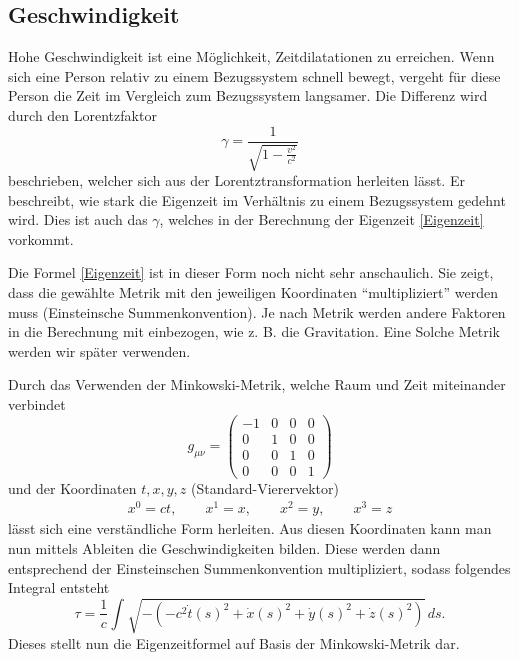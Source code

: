 \begin{refsection}
\subsection{Geschwindigkeit}
Hohe Geschwindigkeit ist eine Möglichkeit, Zeitdilatationen zu erreichen. Wenn sich eine Person relativ zu einem Bezugssystem schnell bewegt, vergeht für diese Person die Zeit im Vergleich zum Bezugssystem langsamer. Die Differenz wird durch den Lorentzfaktor 
\begin{equation} \label{lorentzfaktor}
\gamma=\frac{1}{\sqrt{1-\displaystyle\frac{v^2}{c^2}}} 
\end{equation}
beschrieben, welcher sich aus der Lorentztransformation herleiten lässt.
Er beschreibt, wie stark die Eigenzeit im Verhältnis zu einem Bezugssystem gedehnt wird. 
Dies ist auch das $\gamma$, welches in der Berechnung der Eigenzeit \eqref{Eigenzeit} vorkommt. 

Die Formel \eqref{Eigenzeit} ist in dieser Form noch nicht sehr anschaulich. Sie zeigt, dass die gewählte Metrik mit den jeweiligen Koordinaten ``multipliziert'' werden muss (Einsteinsche Summenkonvention). Je nach Metrik werden andere Faktoren in die Berechnung mit einbezogen, wie z. B. die Gravitation. Eine Solche Metrik werden wir später verwenden.

Durch das Verwenden der Minkowski-Metrik, welche Raum und Zeit miteinander verbindet 
\begin{equation}
    g_{\mu\nu}=
    \begin{pmatrix}
        -1 & 0 & 0 & 0 \\
        0 & 1 & 0 & 0 \\
        0 & 0 & 1 & 0 \\
        0 & 0 & 0 & 1
    \end{pmatrix}
\end{equation}
und der Koordinaten $t, x, y, z$ (Standard-Vierervektor)
\begin{align*}
x^{0}=ct,\qquad x^{1}=x,\qquad x^{2}=y,\qquad x^{3}=z 
\end{align*}
lässt sich eine verständliche Form herleiten.
Aus diesen Koordinaten kann man nun mittels Ableiten die Geschwindigkeiten bilden. Diese werden dann entsprechend der Einsteinschen Summenkonvention multipliziert, sodass folgendes Integral entsteht 
\begin{equation}\label{minkowski}
    \tau
    =
    \frac{1}{c}\int_{}^{}\sqrt{-(-c^2\dot{t}(s)^{2}+\dot{x}(s)^{2}+\dot{y}(s)^{2}+\dot{z}(s)^{2})}\,ds.
\end{equation} 
Dieses stellt nun die Eigenzeitformel auf Basis der Minkowski-Metrik dar.


\end{refsection}
